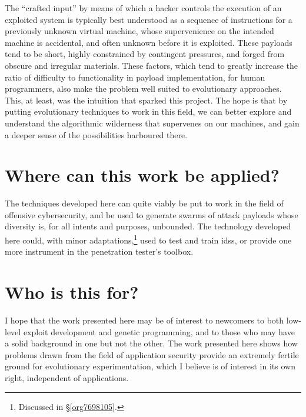 \documentclass[12pt,glossary]{dalthesis}
\begin{document}
The ``crafted input'' by means of which a hacker controls the execution of
an exploited system is typically best understood as a sequence of instructions
for a previously unknown virtual machine, whose supervenience on the intended
machine is accidental, and often unknown before it is exploited.
These payloads tend to be short, highly constrained by contingent
pressures, and forged from obscure and irregular materials. These factors,
which tend to greatly increase the ratio of difficulty to functionality in
payload implementation, for human programmers, also make the problem
well suited to evolutionary approaches. This, at least, was the intuition
that sparked this project. The hope is that by putting evolutionary techniques
to work in this field, we can better explore and understand the algorithmic
wilderness that supervenes on our machines, and gain a deeper sense of the
possibilities harboured there.

\section{Where can this work be applied?}
\label{sec:orgc1c8b30}
The techniques developed here can quite viably be put to work in the field of
offensive cybersecurity, and be used to generate swarms of attack payloads whose
diversity is, for all intents and purposes, unbounded. The technology developed
here could, with minor adaptations,\footnote{Discussed in \S \ref{org7698105}.} used
to test and train \glspl{ids}, or provide one more instrument in the penetration
tester's toolbox.

\section{Who is this for?}
\label{sec:org38791a2}

I hope that the work presented here may be of interest to newcomers to
both low-level exploit development and genetic programming, and to those
who may have a solid background in one but not the other. The work presented
here shows how problems drawn from the field of application security provide
an extremely fertile ground for evolutionary experimentation, which I believe
is of interest in its own right, independent of applications. 
\end{document}
